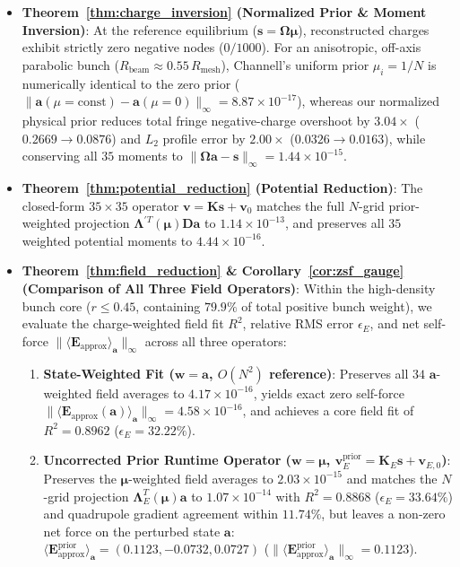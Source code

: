 \documentclass[11pt,a4paper]{article}
\newcommand{\bOmega}{\mathbf{\Omega}}
\newcommand{\bLambda}{\mathbf{\Lambda}}
\begin{document}
\begin{itemize}
    \item \textbf{Theorem~\ref{thm:charge_inversion} (Normalized Prior \& Moment Inversion)}: At the reference equilibrium ($\bm{s} = \bOmega\bm{\mu}$), reconstructed charges exhibit strictly zero negative nodes ($0/1000$). For an anisotropic, off-axis parabolic bunch ($R_{\mathrm{beam}} \approx 0.55\,R_{\mathrm{mesh}}$), Channell's uniform prior $\mu_i = 1/N$ is numerically identical to the zero prior ($\|\bm{a}(\mu=\mathrm{const}) - \bm{a}(\mu=0)\|_\infty = 8.87 \times 10^{-17}$), whereas our normalized physical prior reduces total fringe negative-charge overshoot by $3.04\times$ ($0.2669 \to 0.0876$) and $L_2$ profile error by $2.00\times$ ($0.0326 \to 0.0163$), while conserving all $35$ moments to $\|\bOmega\bm{a} - \bm{s}\|_\infty = 1.44 \times 10^{-15}$.
    \item \textbf{Theorem~\ref{thm:potential_reduction} (Potential Reduction)}: The closed-form $35 \times 35$ operator $\bm{v} = \bm{K}\bm{s} + \bm{v}_0$ matches the full $N$-grid prior-weighted projection $\bLambda^{\prime T}(\bm{\mu})\bm{D}\bm{a}$ to $1.14 \times 10^{-13}$, and preserves all $35$ weighted potential moments to $4.44 \times 10^{-16}$.
    \item \textbf{Theorem~\ref{thm:field_reduction} \& Corollary~\ref{cor:zsf_gauge} (Comparison of All Three Field Operators)}:
    Within the high-density bunch core ($r \le 0.45$, containing $79.9\%$ of total positive bunch weight), we evaluate the charge-weighted field fit $R^2$, relative RMS error $\epsilon_E$, and net self-force $\|\langle \bm{E}_{\mathrm{approx}}\rangle_{\bm{a}}\|_\infty$ across all three operators:
    \begin{enumerate}
        \item \textbf{State-Weighted Fit ($\bm{w}=\bm{a}$, $O(N^2)$ reference)}: Preserves all $34$ $\bm{a}$-weighted field averages to $4.17 \times 10^{-16}$, yields exact zero self-force $\|\langle \bm{E}_{\mathrm{approx}}(\bm{a})\rangle_{\bm{a}}\|_\infty = 4.58 \times 10^{-16}$, and achieves a core field fit of $R^2 = 0.8962$ ($\epsilon_E = 32.22\%$).
        \item \textbf{Uncorrected Prior Runtime Operator ($\bm{w}=\bm{\mu}$, $\bm{v}_E^{\mathrm{prior}} = \bm{K}_E\bm{s} + \bm{v}_{E,0}$)}: Preserves the $\bm{\mu}$-weighted field averages to $2.03 \times 10^{-15}$ and matches the $N$-grid projection $\bLambda_E^T(\bm{\mu})\bm{a}$ to $1.07 \times 10^{-14}$ with $R^2 = 0.8868$ ($\epsilon_E = 33.64\%$) and quadrupole gradient agreement within $11.74\%$, but leaves a non-zero net force on the perturbed state $\bm{a}$: $\langle \bm{E}_{\mathrm{approx}}^{\mathrm{prior}}\rangle_{\bm{a}} = (0.1123, -0.0732, 0.0727)$ ($\|\langle \bm{E}_{\mathrm{approx}}^{\mathrm{prior}}\rangle_{\bm{a}}\|_\infty = 0.1123$).

\end{enumerate}
\end{itemize}
\end{document}

